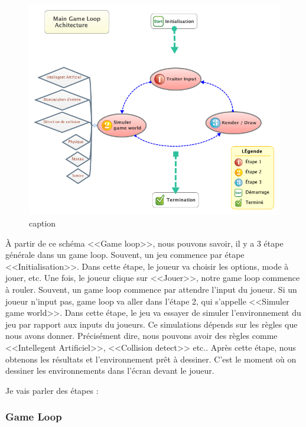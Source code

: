 \begin{figure}[htbp]
	\centering
		\includegraphics[width=6in]{XMinds/MainGameLoopAchitecture.png}
	\caption{caption}
	\label{fig:XMinds_MainGameLoopAchitecture}
\end{figure}

À partir de ce schéma <<Game loop>>, nous pouvons savoir, il y a 3 étape générale dans un game loop. Souvent, un jeu commence par étape <<Initialisation>>. Dans cette étape, le joueur va choisir les options, mode à jouer, etc. Une fois, le joueur clique sur <<Jouer>>, notre game loop commence à rouler. Souvent, un game loop commence par attendre l'input du joueur. Si un joueur n'input pas, game loop va aller dans l'étape 2, qui s'appelle <<Simuler game world>>. Dans cette étape, le jeu va essayer de simuler l'environnement du jeu par rapport aux inputs du joueurs. Ce simulations dépends sur les règles que nous avons donner. Précisément dire, nous pouvons avoir des règles comme <<Intellegent Artificiel>>, <<Collision detect>> etc.. Après cette étape, nous obtenons les résultats et l'environnement prêt à dessiner. C'est le moment où on dessiner les environnements dans l'écran devant le joueur.

Je vais parler des étapes :

\subsubsection{Game Loop} %
\label{ssub:game_loop}

